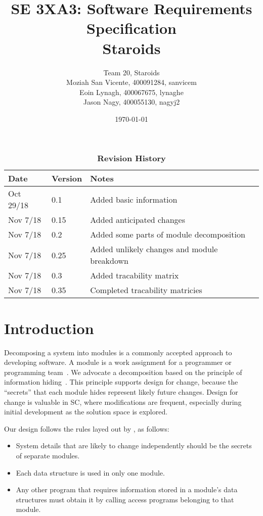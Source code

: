 \documentclass[12pt, titlepage]{article}
\title{SE 3XA3: Software Requirements Specification\\Staroids}
\author{Team 20, Staroids
  \\ Moziah San Vicente, 400091284, sanvicem
  \\ Eoin Lynagh, 400067675, lynaghe
  \\ Jason Nagy, 400055130, nagyj2
}
\date{\today}
\begin{document}
\maketitle

\tableofcontents
\listoftables
\listoffigures

\begin{table}[bp]
\caption{\bf Revision History}
\begin{tabularx}{\textwidth}{p{3cm}p{2cm}X}
\toprule {\bf Date} & {\bf Version} & {\bf Notes}\\
\midrule
Oct 29/18 & 0.1 & Added basic information\\
Nov 7/18 & 0.15 & Added anticipated changes\\
Nov 7/18 & 0.2 & Added some parts of module decomposition\\
Nov 7/18 & 0.25 & Added unlikely changes and module breakdown\\
Nov 7/18 & 0.3 & Added tracability matrix\\
Nov 7/18 & 0.35 & Completed tracability matricies\\
\bottomrule
\end{tabularx}
\end{table}

\newpage


\section{Introduction}

Decomposing a system into modules is a commonly accepted approach to developing
software.  A module is a work assignment for a programmer or programming
team~\citep{ParnasEtAl1984}.  We advocate a decomposition
based on the principle of information hiding~\citep{Parnas1972a}.  This
principle supports design for change, because the ``secrets'' that each module
hides represent likely future changes.  Design for change is valuable in SC,
where modifications are frequent, especially during initial development as the
solution space is explored.

Our design follows the rules layed out by \citet{ParnasEtAl1984}, as follows:
\begin{itemize}
\item System details that are likely to change independently should be the
  secrets of separate modules.
\item Each data structure is used in only one module.
\item Any other program that requires information stored in a module's data
  structures must obtain it by calling access programs belonging to that module.
\end{itemize}
\end{document}
